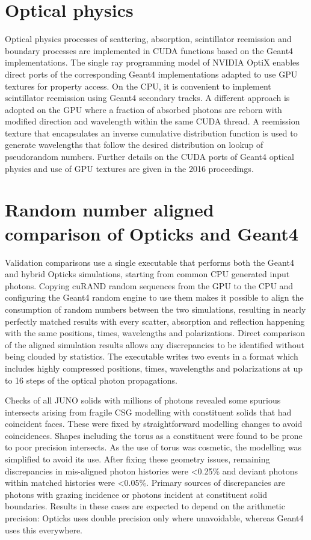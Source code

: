 \documentclass{webofc}
\begin{document}
\section{Optical physics}%
%
Optical physics processes of scattering, absorption, scintillator reemission and 
boundary processes are implemented in CUDA functions based on the Geant4
implementations. 
%
The single ray programming model of NVIDIA OptiX enables 
direct ports of the corresponding Geant4 implementations adapted
to use GPU textures for property access. 
%
On the CPU, it is convenient to implement scintillator reemission using Geant4 secondary 
tracks. A different approach is adopted on the GPU where a fraction of absorbed photons
are reborn with modified direction and wavelength within the same CUDA thread. 
A reemission texture that encapsulates an inverse cumulative distribution function 
is used to generate wavelengths that follow the desired distribution on lookup of pseudorandom numbers. 
%
Further details on the CUDA ports of Geant4 optical physics and use of GPU textures 
are given in the 2016 proceedings\cite{chep2016}.
%
%
%
\section{Random number aligned comparison of Opticks and Geant4}
\label{validation}
%
Validation comparisons use a single executable that performs both
the Geant4 and hybrid Opticks simulations, starting from common CPU generated input photons. 
Copying cuRAND random sequences from the GPU to the CPU and configuring the Geant4 random engine to use them makes it possible to align the 
consumption of random numbers between the two simulations, resulting in nearly perfectly matched results with every scatter, 
absorption and reflection happening with the same positions, times, wavelengths and polarizations.
Direct comparison of the aligned simulation results allows any discrepancies to be identified without
being clouded by statistics.
The executable writes two events in a format which includes highly compressed positions, times, wavelengths 
and polarizations at up to 16 steps of the optical photon propagations.

Checks of all JUNO solids with millions of photons revealed some spurious intersects  
arising from fragile CSG modelling with constituent solids that had coincident faces.  
These were fixed by straightforward modelling changes to avoid coincidences. 
Shapes including the torus as a constituent were found to be prone to poor precision intersects. 
As the use of torus was cosmetic, the modelling was simplified to avoid its use.  
After fixing these geometry issues, remaining discrepancies in mis-aligned photon histories
were <0.25\% and deviant photons within matched histories were <0.05\%. 
Primary sources of discrepancies are photons with grazing incidence or photons incident
at constituent solid boundaries. Results in these cases are expected to depend on the arithmetic precision: Opticks uses double precision 
only where unavoidable, whereas Geant4 uses this everywhere. 
%
%
\end{document}
